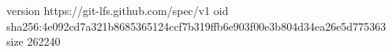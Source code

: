 version https://git-lfs.github.com/spec/v1
oid sha256:4e092cd7a321b8685365124ccf7b319ffb6e903f00e3b804d34ea26e5d775363
size 262240
